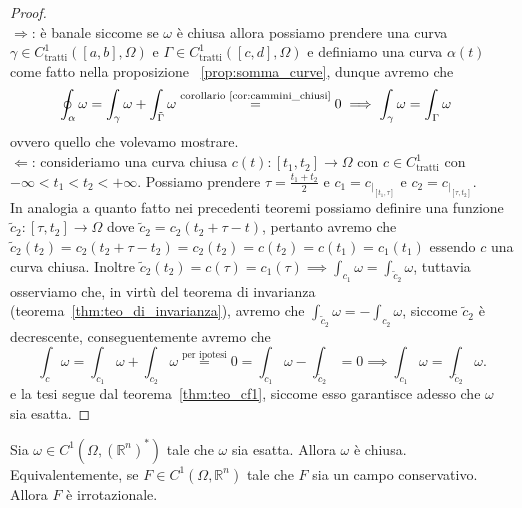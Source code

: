 \begin{proof} \hspace{1cm} \\
	$\boxed{\Rightarrow}$: è banale siccome se $\omega$ è chiusa allora possiamo prendere una curva $\gamma \in C^1_\text{tratti}([a, b], \Omega)$ e $\Gamma \in C^1_\text{tratti}([c, d], \Omega)$ e definiamo una curva $\alpha(t)$ come fatto nella proposizione
	~\ref{prop:somma_curve}, dunque avremo che
	\begin{align*}
	&\oint_\alpha \omega = \int_\gamma \omega + \int_{\tilde{\Gamma}} \omega \stackrel{\text{corollario~\ref{cor:cammini_chiusi}}}{=} 0 \implies \int_\gamma \omega = \int_\Gamma \omega &
	\end{align*}
	ovvero quello che volevamo mostrare. \\
	$\boxed{\Leftarrow}$: consideriamo una curva chiusa $c(t): [t_1, t_2] \to \Omega$ con $c \in C^1_\text{tratti}$ con $-\infty < t_1 < t_2 < +\infty$. Possiamo prendere $\tau = \frac{t_1 + t_2}{2}$ e $c_1 = c_{|_{[t_1, \tau]}}$ e $c_2 = c_{|_{[\tau, t_2]}}$. \\
	In analogia a quanto fatto nei precedenti teoremi possiamo definire una funzione $\tilde{c}_2: [\tau, t_2] \to \Omega$ dove $\tilde{c}_2 = c_2(t_2 + \tau - t)$, pertanto avremo che $\tilde{c}_2(t_2) = c_2(t_2 + \tau - t_2) = c_2(t_2) = c(t_2) = c(t_1) = c_1(t_1)$ essendo $c$ una curva chiusa.
	Inoltre $\tilde{c}_2(t_2) = c(\tau) = c_1(\tau) \implies \int_{c_1} \omega = \int_{\tilde{c}_2} \omega$, tuttavia osserviamo che, in virtù del teorema di invarianza (teorema~\ref{thm:teo_di_invarianza}), avremo che $\int_{\tilde{c}_2} \omega = - \int_{c_2} \omega$, siccome $\tilde{c}_2$ è decrescente, conseguentemente avremo che
	$$
	\int_c \omega = \int_{c_1} \omega + \int_{c_2} \omega \stackrel{\text{per ipotesi}}{=} 0 = \int_{c_1} \omega - \int_{\tilde{c}_2} = 0 \implies \int_{c_1} \omega = \int_{\tilde{c}_2} \omega.
	$$
	e la tesi segue dal teorema~\ref{thm:teo_cf1}, siccome esso garantisce adesso che $\omega$ sia esatta.
\end{proof}
\begin{prop}
	Sia $\omega \in C^1(\Omega, (\mathbb{R}^n)^*)$ tale che $\omega$ sia esatta. Allora $\omega$ è chiusa. \\
	Equivalentemente, se $F \in C^1(\Omega, \mathbb{R}^n)$ tale che $F$ sia un campo conservativo. Allora $F$ è irrotazionale.
	\label{prop:esattezza_imp_chiusura}
\end{prop}
